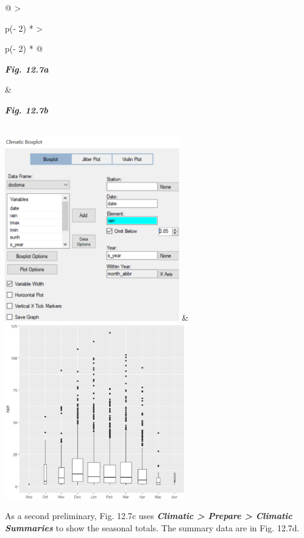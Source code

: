\documentclass[
  letterpaper,
  DIV=11,
  numbers=noendperiod]{scrreprt}
\begin{document}
\begin{longtable}[]{@{}
  >{\raggedright\arraybackslash}p{(\columnwidth - 2\tabcolsep) * }
  >{\raggedright\arraybackslash}p{(\columnwidth - 2\tabcolsep) * }@{}}
\toprule\noalign{}
\begin{minipage}[b]{\linewidth}\raggedright
\textbf{\emph{Fig. 12.7a}}
\end{minipage} & \begin{minipage}[b]{\linewidth}\raggedright
\textbf{\emph{Fig. 12.7b}}
\end{minipage} \\
\midrule\noalign{}
\endhead
\bottomrule\noalign{}
\endlastfoot
\includegraphics[width=2.97699in,height=3.1413in]{figures/Fig12.7a.png}
&
\includegraphics[width=3.06958in,height=2.99362in]{figures/Fig12.7b.png} \\
\end{longtable}

As a second preliminary, Fig. 12.7c uses \textbf{\emph{Climatic
\textgreater{} Prepare \textgreater{} Climatic Summaries}} to show the
seasonal totals. The summary data are in Fig. 12.7d.
\end{document}
